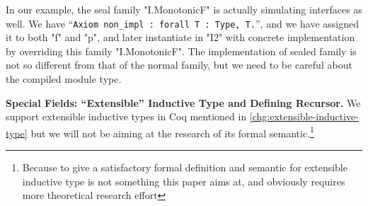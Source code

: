 In our example, the seal family "I.MonotonicF" is actually simulating
interfaces as well.  We have
\mbox{``\texttt{Axiom non_impl : forall {T : Type}, T.}''},
and we have assigned it to both "f" and "p", and later instantiate in
"I2" with concrete implementation by overriding this family
"I.MonotonicF".
The implementation of sealed family is not so different from that of the normal family, but we need to be careful about the compiled module type. 



\textbf{Special Fields: ``Extensible'' Inductive Type and Defining Recursor.}
We support extensible inductive types in Coq mentioned in
\ref{chg:extensible-inductive-type} but we will not be aiming at the research of its formal semantic.\footnote{Because to give a satisfactory formal definition and semantic for extensible inductive type is not something this paper aims at, and obviously requires more theoretical research effort}

